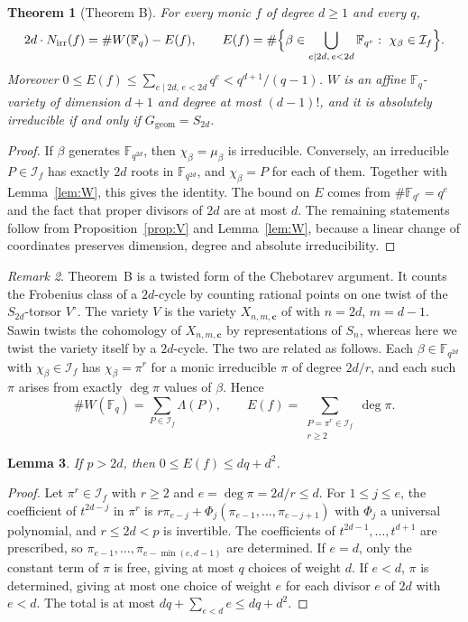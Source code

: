\documentclass[11pt,a4paper]{article}
\newtheorem{theorem}{Theorem}[section]
\newtheorem{lemma}[theorem]{Lemma}
\theoremstyle{definition}
\theoremstyle{remark}
\newtheorem{remark}[theorem]{Remark}
\newcommand{\Fq}{\mathbb{F}_q}
\newcommand{\Ggeom}{G_{\mathrm{geom}}}
\newcommand{\Nirr}{N_{\mathrm{irr}}}
\newcommand{\cI}{\mathcal{I}}
\begin{document}
\begin{theorem}[Theorem B]\label{thm:identity}
For every monic $f$ of degree $d\ge1$ and every $q$,
\[
  2d\cdot\Nirr(f)=\#W(\Fq)-E(f),\qquad
  E(f)=\#\Bigl\{\beta\in\bigcup_{e\mid2d,\,e<2d}\mathbb{F}_{q^e}:\ \chi_\beta\in\cI_f\Bigr\}.
\]
Moreover $0\le E(f)\le\sum_{e\mid 2d,\,e<2d}q^e<q^{d+1}/(q-1)$.
$W$ is an affine $\Fq$-variety of dimension $d+1$ and degree at most $(d-1)!$,
and it is absolutely irreducible if and only if $\Ggeom=S_{2d}$.
\end{theorem}

\begin{proof}
If $\beta$ generates $\mathbb{F}_{q^{2d}}$, then $\chi_\beta=\mu_\beta$ is irreducible.
Conversely, an irreducible $P\in\cI_f$ has exactly $2d$ roots in $\mathbb{F}_{q^{2d}}$,
and $\chi_\beta=P$ for each of them. Together with Lemma~\ref{lem:W}, this gives the identity.
The bound on $E$ comes from $\#\mathbb{F}_{q^e}=q^e$ and the fact that proper divisors of
$2d$ are at most $d$. The remaining statements follow from Proposition~\ref{prop:V}
and Lemma~\ref{lem:W}, because a linear change of coordinates preserves dimension,
degree and absolute irreducibility.
\end{proof}

\begin{remark}\label{rem:twist}
Theorem~B is a twisted form of the Chebotarev argument. It counts the Frobenius class of a
$2d$-cycle by counting rational points on one twist of the $S_{2d}$-torsor $V^\circ$.
The variety $V$ is the variety $X_{n,m,\mathbf c}$ of \cite{Sawin2021} with $n=2d$, $m=d-1$.
Sawin twists the cohomology of $X_{n,m,\mathbf c}$ by representations of $S_n$, whereas here we
twist the variety itself by a $2d$-cycle. The two are related as follows.
Each $\beta\in\mathbb F_{q^{2d}}$ with $\chi_\beta\in\cI_f$ has $\chi_\beta=\pi^r$ for a monic
irreducible $\pi$ of degree $2d/r$, and each such $\pi$ arises from exactly $\deg\pi$ values of $\beta$. Hence
\begin{equation}\label{eq:W-Lambda}
  \#W(\Fq)=\sum_{P\in\cI_f}\Lambda(P),\qquad E(f)=\sum_{\substack{P=\pi^r\in\cI_f\\ r\ge2}}\deg\pi .
\end{equation}
\end{remark}

\begin{lemma}\label{lem:Esharp}
If $p>2d$, then $0\le E(f)\le dq+d^2$.
\end{lemma}

\begin{proof}
Let $\pi^r\in\cI_f$ with $r\ge2$ and $e=\deg\pi=2d/r\le d$. For $1\le j\le e$, the coefficient of
$t^{2d-j}$ in $\pi^r$ is $r\pi_{e-j}+\Phi_j(\pi_{e-1},\dots,\pi_{e-j+1})$ with $\Phi_j$ a universal
polynomial, and $r\le 2d<p$ is invertible. The coefficients of $t^{2d-1},\dots,t^{d+1}$ are prescribed,
so $\pi_{e-1},\dots,\pi_{e-\min(e,d-1)}$ are determined. If $e=d$, only the constant term of $\pi$ is
free, giving at most $q$ choices of weight $d$. If $e<d$, $\pi$ is determined, giving at most one choice
of weight $e$ for each divisor $e$ of $2d$ with $e<d$. The total is at most $dq+\sum_{e<d}e\le dq+d^2$.
\end{proof}
\end{document}
